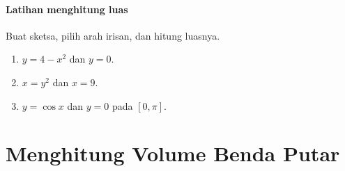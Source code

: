 \documentclass{../../kalkulus-ppt}
\begin{document}
\begin{frame}{\insertsection}
    \framesubtitle{Latihan menghitung luas}
    \begin{latihan}
        Buat sketsa, pilih arah irisan, dan hitung luasnya.
        \begin{enumerate}
            \item $y=4-x^2$ dan $y=0$.
            \item $x=y^2$ dan $x=9$.
            \item $y=\cos x$ dan $y=0$ pada $[0,\pi]$.
        \end{enumerate}
    \end{latihan}
\end{frame}

\section{Menghitung Volume Benda Putar}
\end{document}
